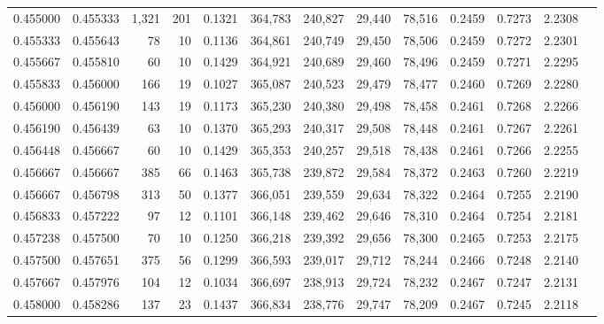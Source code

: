 \begin{tabular}{rrrrrrrrrrrrr}
0.455000 & 0.455333 & 1,321 & 201 &                                     0.1321 & 364,783 & 240,827 &  29,440 &  78,516 & 0.2459 & 0.7273 & 2.2308 \\
0.455333 & 0.455643 &    78 &  10 &                                     0.1136 & 364,861 & 240,749 &  29,450 &  78,506 & 0.2459 & 0.7272 & 2.2301 \\
0.455667 & 0.455810 &    60 &  10 &                                     0.1429 & 364,921 & 240,689 &  29,460 &  78,496 & 0.2459 & 0.7271 & 2.2295 \\
0.455833 & 0.456000 &   166 &  19 &                                     0.1027 & 365,087 & 240,523 &  29,479 &  78,477 & 0.2460 & 0.7269 & 2.2280 \\
0.456000 & 0.456190 &   143 &  19 &                                     0.1173 & 365,230 & 240,380 &  29,498 &  78,458 & 0.2461 & 0.7268 & 2.2266 \\
0.456190 & 0.456439 &    63 &  10 &                                     0.1370 & 365,293 & 240,317 &  29,508 &  78,448 & 0.2461 & 0.7267 & 2.2261 \\
0.456448 & 0.456667 &    60 &  10 &                                     0.1429 & 365,353 & 240,257 &  29,518 &  78,438 & 0.2461 & 0.7266 & 2.2255 \\
0.456667 & 0.456667 &   385 &  66 &                                     0.1463 & 365,738 & 239,872 &  29,584 &  78,372 & 0.2463 & 0.7260 & 2.2219 \\
0.456667 & 0.456798 &   313 &  50 &                                     0.1377 & 366,051 & 239,559 &  29,634 &  78,322 & 0.2464 & 0.7255 & 2.2190 \\
0.456833 & 0.457222 &    97 &  12 &                                     0.1101 & 366,148 & 239,462 &  29,646 &  78,310 & 0.2464 & 0.7254 & 2.2181 \\
0.457238 & 0.457500 &    70 &  10 &                                     0.1250 & 366,218 & 239,392 &  29,656 &  78,300 & 0.2465 & 0.7253 & 2.2175 \\
0.457500 & 0.457651 &   375 &  56 &                                     0.1299 & 366,593 & 239,017 &  29,712 &  78,244 & 0.2466 & 0.7248 & 2.2140 \\
0.457667 & 0.457976 &   104 &  12 &                                     0.1034 & 366,697 & 238,913 &  29,724 &  78,232 & 0.2467 & 0.7247 & 2.2131 \\
0.458000 & 0.458286 &   137 &  23 &                                     0.1437 & 366,834 & 238,776 &  29,747 &  78,209 & 0.2467 & 0.7245 & 2.2118 \\

\end{tabular}
